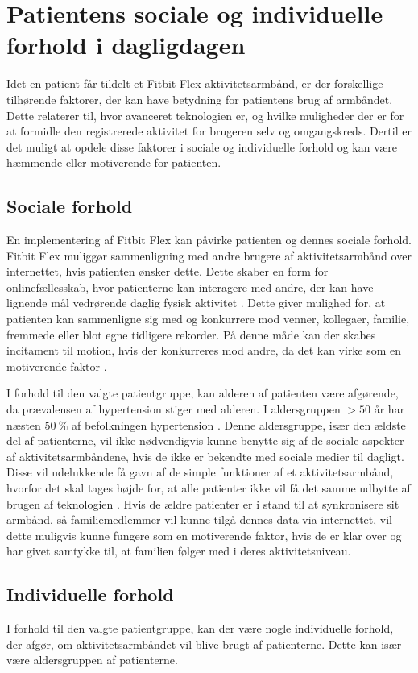 \section{Patientens sociale og individuelle forhold i dagligdagen}
Idet en patient får tildelt et Fitbit Flex-aktivitetsarmbånd, er der forskellige tilhørende faktorer, der kan have betydning for patientens brug af armbåndet. 
Dette relaterer til, hvor avanceret teknologien er, og hvilke muligheder der er for at formidle den registrerede aktivitet for brugeren selv og omgangskreds. Dertil er det muligt at opdele disse faktorer i sociale og individuelle forhold og kan være hæmmende eller motiverende for patienten.   

\subsection{Sociale forhold}
En implementering af Fitbit Flex kan påvirke patienten og dennes sociale forhold. Fitbit Flex muliggør sammenligning med andre brugere af aktivitetsarmbånd over internettet, hvis patienten ønsker dette. Dette skaber en form for onlinefællesskab, hvor patienterne kan interagere med andre, der kan have lignende mål vedrørende daglig fysisk aktivitet \citep{karapanos2016}. 
Dette giver mulighed for, at patienten kan sammenligne sig med og konkurrere mod venner, kollegaer, familie, fremmede eller blot egne tidligere rekorder. På denne måde kan der skabes incitament til motion, hvis der konkurreres mod andre, da det kan virke som en motiverende faktor \citep{rooksby2014}.

I forhold til den valgte patientgruppe, kan alderen af patienten være afgørende, da prævalensen af hypertension stiger med alderen. I aldersgruppen $>50$ år har næsten $50~\%$ af befolkningen hypertension \citep{kronborg2008}. Denne aldersgruppe, især den ældste del af patienterne, vil ikke nødvendigvis kunne benytte sig af de sociale aspekter af aktivitetsarmbåndene, hvis de ikke er bekendte med sociale medier til dagligt. Disse vil udelukkende få gavn af de simple funktioner af et aktivitetsarmbånd, hvorfor det skal tages højde for, at alle patienter ikke vil få det samme udbytte af brugen af teknologien \citep{mercer2016}. Hvis de ældre patienter er i stand til at synkronisere sit armbånd, så familiemedlemmer vil kunne tilgå dennes data via internettet, vil dette muligvis kunne fungere som en motiverende faktor, hvis de er klar over og har givet samtykke til, at familien følger med i deres aktivitetsniveau.

\subsection{Individuelle forhold}
I forhold til den valgte patientgruppe, kan der være nogle individuelle forhold, der afgør, om aktivitetsarmbåndet vil blive brugt af patienterne. Dette kan især være aldersgruppen af patienterne. 

